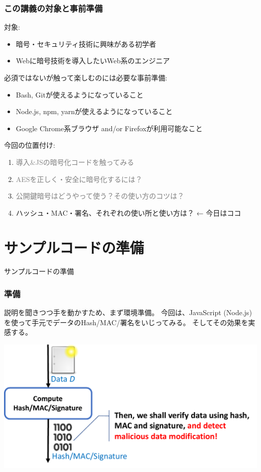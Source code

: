 \documentclass[12pt,dvipdfmx]{beamer}
\begin{document}
\begin{frame}
\frametitle{この講義の対象と事前準備}
対象:
\begin{itemize}
\item 暗号・セキュリティ技術に興味がある初学者
\item Webに暗号技術を導入したいWeb系のエンジニア
\end{itemize}

\vspace{2ex}

必須ではないが触って楽しむのには必要な事前準備:
\begin{itemize}
\item Bash, Gitが使えるようになっていること
\item Node.js, npm, yarnが使えるようになっていること
\item Google Chrome系ブラウザ and/or Firefoxが利用可能なこと
\end{itemize}
\end{frame}

\begin{frame}
今回の位置付け:
\begin{enumerate}
 \item \textcolor{gray}{導入\&JSの暗号化コードを触ってみる}
 \item \textcolor{gray}{AESを正しく・安全に暗号化するには？}
 \item \textcolor{gray}{公開鍵暗号はどうやって使う？その使い方のコツは？}
 \item \alert{ハッシュ・MAC・署名、それぞれの使い所と使い方は？} ← 今日はココ
\end{enumerate}

\end{frame}


\section{サンプルコードの準備}
\begin{frame}
\centering
{\Large サンプルコードの準備}
\end{frame}

\begin{frame}
\frametitle{準備}
\small
説明を聞きつつ手を動かすため、まず環境準備。
\alert{今回は、JavaScript (Node.js) を使って手元でデータのHash/MAC/署名をいじってみる。}
そしてその効果を実感する。

\begin{center}
\includegraphics[width=0.7\linewidth]{Figs/md-flow.pdf}
\end{center}

\end{frame}
\end{document}

